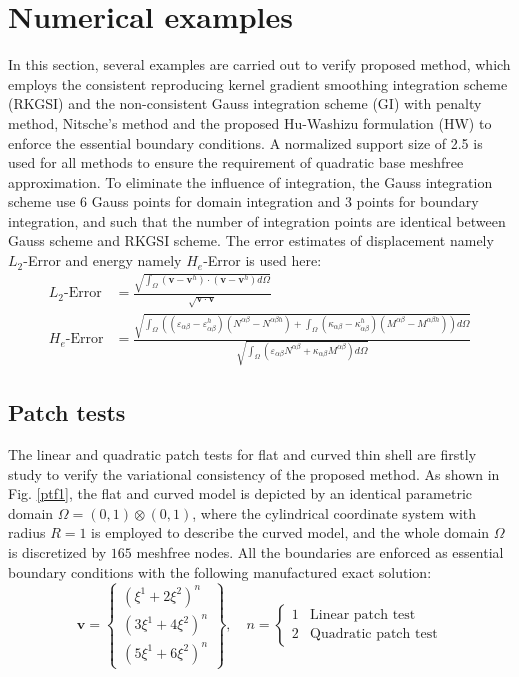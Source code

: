
\section{Numerical examples}
In this section, several examples are carried out to verify proposed method, which employs the consistent reproducing kernel gradient smoothing integration scheme (RKGSI) and the non-consistent Gauss integration scheme (GI) with penalty method, Nitsche's method and the proposed Hu-Washizu formulation (HW) to enforce the essential boundary conditions. A normalized support size of 2.5 is used for all methods to ensure the requirement of quadratic base meshfree approximation. To eliminate the influence of integration, the Gauss integration scheme use 6 Gauss points for domain integration and 3 points for boundary integration, and such that the number of integration points are identical between Gauss scheme and RKGSI scheme. The error estimates of displacement namely $L_2$-Error and energy namely $H_e$-Error is used here:
\begin{equation}
\begin{split}
L_2\text{-Error} &= \frac{\sqrt{\int_\Omega(\boldsymbol v - \boldsymbol v^h) \cdot (\boldsymbol v - \boldsymbol v^h)d\Omega}}{\sqrt{\boldsymbol v \cdot \boldsymbol v}} \\
H_e\text{-Error} &= \frac{\sqrt{\int_\Omega \left ((\varepsilon_{\alpha\beta} - \varepsilon_{\alpha\beta}^h)(N^{\alpha\beta} - N^{\alpha\beta h}) + \int_\Omega(\kappa_{\alpha\beta}-\kappa_{\alpha\beta}^h)(M^{\alpha\beta}-M^{\alpha\beta h}) \right )d\Omega}}{\sqrt{\int_\Omega(\varepsilon_{\alpha\beta}N^{\alpha\beta} + \kappa_{\alpha\beta}M^{\alpha\beta})d\Omega}}
\end{split}
\end{equation}

\subsection{Patch tests}
The linear and quadratic patch tests for flat and curved thin shell are firstly study to verify the variational consistency of the proposed method. As shown in Fig. \ref{ptf1}, the flat and curved model is depicted by an identical parametric domain $\Omega = (0,1)\otimes(0,1)$, where the cylindrical coordinate system with radius $R=1$ is employed to describe the curved model, and the whole domain $\Omega$ is discretized by $165$ meshfree nodes. All the boundaries are enforced as essential boundary conditions with the following manufactured exact solution:
\begin{equation}
\boldsymbol v = \begin{Bmatrix}
(\xi^1+2\xi^2)^n \\ (3\xi^1+4\xi^2)^n \\ (5\xi^1+6\xi^2)^n
\end{Bmatrix},\quad
n = \begin{cases}
1 & \text{Linear patch test} \\
2 & \text{Quadratic patch test}
\end{cases}
\end{equation}

